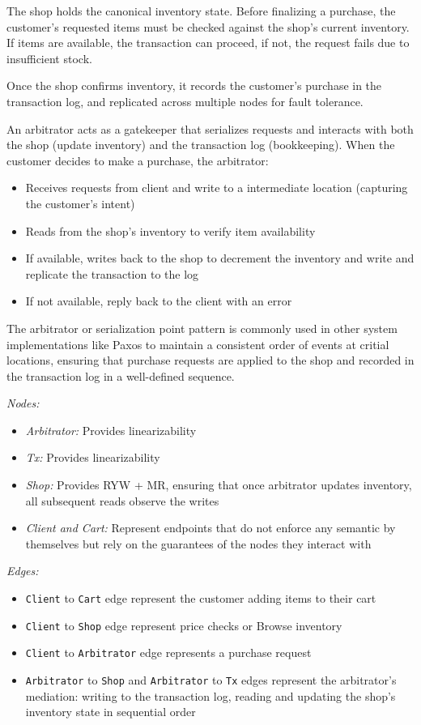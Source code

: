 The shop holds the canonical inventory state. Before finalizing a purchase, the
customer's requested items must be checked against the shop's current inventory.
If items are available, the transaction can proceed, if not, the request fails
due to insufficient stock.

Once the shop confirms inventory, it records the customer's purchase in the
transaction log, and replicated across multiple nodes for fault tolerance.

An arbitrator acts as a gatekeeper that serializes requests and interacts with
both the shop (update inventory) and the transaction log (bookkeeping). When the
customer decides to make a purchase, the arbitrator:
\begin{itemize}
  \item Receives requests from client and write to a intermediate
    location (capturing
    the customer's intent)
  \item Reads from the shop's inventory to verify item availability
  \item If available, writes back to the shop to decrement the
    inventory and write and
    replicate the transaction to the log
  \item If not available, reply back to the client with an error
\end{itemize}

The arbitrator or serialization point pattern is commonly used in other system
implementations like Paxos \cite{lamport2001paxos} to maintain a
consistent order of
events at critial locations, ensuring that purchase requests are applied to the
shop and recorded in the transaction log in a well-defined sequence.

\textit{Nodes:}
\begin{itemize}
  \item \textit{Arbitrator:} Provides linearizability
  \item \textit{Tx:} Provides linearizability
  \item \textit{Shop:} Provides RYW + MR, ensuring that once
    arbitrator updates inventory, all
    subsequent reads observe the writes
  \item \textit{Client and Cart:} Represent endpoints that do not
    enforce any semantic by
    themselves but rely on the guarantees of the nodes they interact with
\end{itemize}

\textit{Edges:}
\begin{itemize}
  \item \texttt{Client} to \texttt{Cart} edge represent the customer
    adding items to their cart
  \item \texttt{Client} to \texttt{Shop} edge represent price checks
    or Browse inventory
  \item \texttt{Client} to \texttt{Arbitrator} edge represents a
    purchase request
  \item \texttt{Arbitrator} to \texttt{Shop} and \texttt{Arbitrator}
    to \texttt{Tx} edges represent the arbitrator's
    mediation: writing to the transaction log, reading and updating the shop's
    inventory state in sequential order
\end{itemize}

